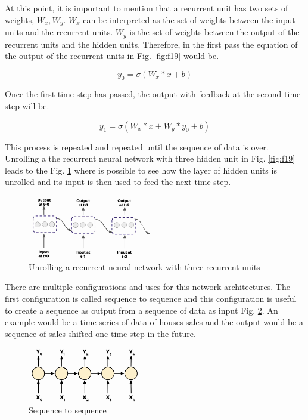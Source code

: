 \documentclass{article}
\begin{document}
At this point, it is important to mention that a recurrent unit has two sets of weights, \(W_x, W_y\). \(W_x\) can be interpreted as the set of weights between the input units and the recurrent units. \(W_y\) is the set of weights between the output of the recurrent units and the hidden units. Therefore, in the first pass the equation of the output of the recurrent units in Fig. \ref{fig:f19} would be.

\[y_0 = \sigma(W_x * x + b)\]

Once the first time step has passed, the output with feedback at the second time step will be.

\[y_1 = \sigma(W_x * x + W_y * y_0 + b)\]

This process is repeated and repeated until the sequence of data is over. Unrolling a the recurrent neural network with three hidden unit in Fig. \ref{fig:f19} leads to the Fig. \ref{fig:f20} where is possible to see how the layer of hidden units is unrolled and its input is then used to feed the next time step.

\begin{figure}[ht]
    \centering
    \includegraphics[width=0.5\textwidth,height=0.5\textheight,keepaspectratio]{images/unrolling_multiple.png}
    \captionsetup{justification=centering}
    \caption{Unrolling a recurrent neural network with three recurrent units}
    \label{fig:f20}
\end{figure}

There are multiple configurations and uses for this network architectures. The first configuration is called sequence to sequence and this configuration is useful to create a sequence as output from a sequence of data as input Fig. \ref{fig:f21}. An example would be a time series of data of houses sales and the output would be a sequence of sales shifted one time step in the future.

\begin{figure}[ht]
    \centering
    \includegraphics[width=0.45\textwidth,height=0.45\textheight,keepaspectratio]{images/sequence_sequence.png}
    \captionsetup{justification=centering}
    \caption{Sequence to sequence}
    \label{fig:f21}
\end{figure}
\end{document}
